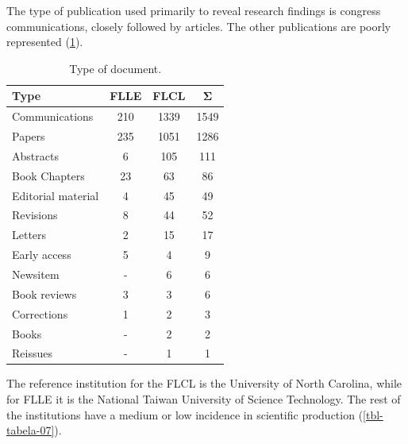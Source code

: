 \documentclass{textolivre-html}
\begin{document}
The type of publication used primarily to reveal research findings is congress communications, closely followed by articles. The other publications are poorly represented (\cref{tbl-tabela-06}).

\begin{table}[htpb]
\caption{Type of document.}
\label{tbl-tabela-06}
\centering
\begin{tabular}{lccc}
\toprule
\textbf{Type} & \textbf{FLLE} & \textbf{FLCL} & \textbf{Σ} \\ 
\midrule
Communications     & 210 & 1339 & 1549 \\ 
Papers             & 235 & 1051 & 1286 \\ 
Abstracts          & 6   & 105  & 111  \\ 
Book Chapters      & 23  & 63   & 86   \\ 
Editorial material & 4   & 45   & 49   \\ 
Revisions          & 8   & 44   & 52   \\ 
Letters            & 2   & 15   & 17   \\ 
Early access       & 5   & 4    & 9    \\ 
Newsitem           & -   & 6    & 6    \\ 
Book reviews       & 3   & 3    & 6    \\ 
Corrections        & 1   & 2    & 3    \\ 
Books              & -   & 2    & 2    \\ 
Reissues           & -   & 1    & 1    \\ 
\bottomrule
\end{tabular}
\end{table}

The reference institution for the FLCL is the University of North Carolina, while for FLLE it is the National Taiwan University of Science Technology. The rest of the institutions have a medium or low incidence in scientific production (\cref{tbl-tabela-07}).
\end{document}
